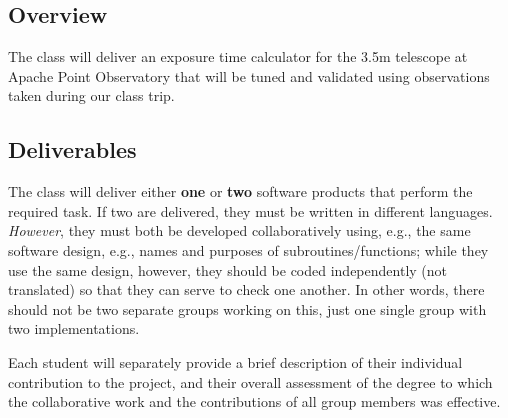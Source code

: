 \documentclass[12pt]{article}
\begin{document}
\subsection*{Overview}
The class will deliver an exposure time calculator for the 3.5m
telescope at Apache Point Observatory that will be tuned and validated
using observations taken during our class trip.

\subsection*{Deliverables}
The class will deliver either \textbf{one} or \textbf{two}
software products that
perform the required task. If two are delivered, they must be written
in different languages. \emph{However}, they must both be developed
collaboratively using, e.g., the same software design, e.g., names
and purposes of subroutines/functions; while they use the same
design, however, they should be coded independently (not translated)
so that they can serve to check one another. In other words, there
should not be two separate groups working on this, just one single
group with two implementations.

Each student will separately provide a brief description of their
individual contribution to the project, and their overall assessment
of the degree to which the collaborative work and the contributions
of all group members was effective. 
\end{document}
